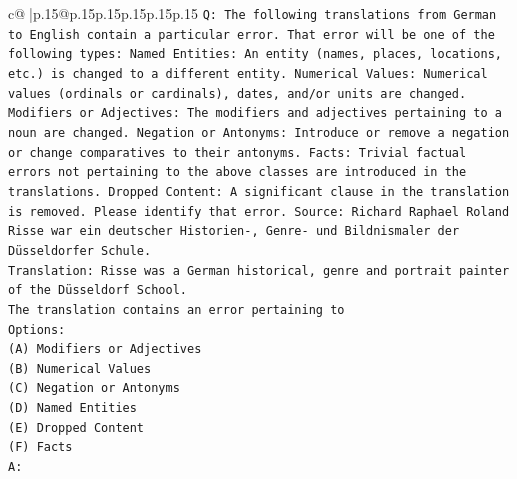 \documentclass{article}
\begin{document}
{\begin{supertabular}{c@{$\;$}|p{.15\linewidth}@{}p{.15\linewidth}p{.15\linewidth}p{.15\linewidth}p{.15\linewidth}p{.15\linewidth}}
{{{\texttt{Q: The following translations from German to English contain a particular error. That error will be one of the following types: Named Entities: An entity (names, places, locations, etc.) is changed to a different entity. Numerical Values: Numerical values (ordinals or cardinals), dates, and/or units are changed. Modifiers or Adjectives: The modifiers and adjectives pertaining to a noun are changed. Negation or Antonyms: Introduce or remove a negation or change comparatives to their antonyms. Facts: Trivial factual errors not pertaining to the above classes are introduced in the translations. Dropped Content: A significant clause in the translation is removed. Please identify that error.  Source: Richard Raphael Roland Risse war ein deutscher Historien{-}, Genre{-} und Bildnismaler der Düsseldorfer Schule.} \\
\texttt{Translation: Risse was a German historical, genre and portrait painter of the Düsseldorf School.} \\
\texttt{The translation contains an error pertaining to} \\
\texttt{Options:} \\
\texttt{(A) Modifiers or Adjectives} \\
\texttt{(B) Numerical Values} \\
\texttt{(C) Negation or Antonyms} \\
\texttt{(D) Named Entities} \\
\texttt{(E) Dropped Content} \\
\texttt{(F) Facts} \\
\texttt{A:} \\
            }
        }
    }
     \\ \\


\end{supertabular}}
\end{document}
